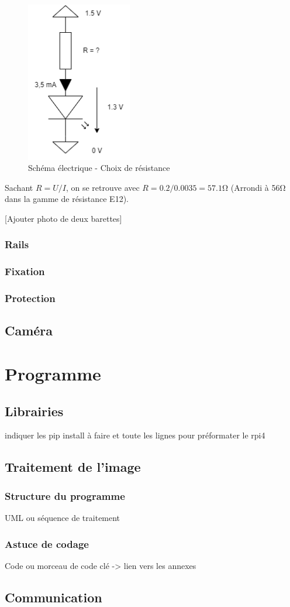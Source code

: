 \begin{figure}[H]
    \centering
    \includegraphics[height=7cm]{assets/figures/schema_led_res.png}
    \caption{Schéma électrique - Choix de résistance}
\end{figure}

Sachant \(R = U / I\), on se retrouve avec \(R = 0.2 / 0.0035 = 57.1 \si{\ohm} \) (Arrondi à 56\si{\ohm} dans la gamme de résistance E12).

    [Ajouter photo de deux barettes]

\subsubsection{Rails}
\subsubsection{Fixation}
\subsubsection{Protection}
\subsection{Caméra}

\section{Programme}
\subsection{Librairies}
indiquer les pip install à faire et toute les lignes pour préformater le rpi4
\subsection{Traitement de l'image}
\subsubsection{Structure du programme}
UML ou séquence de traitement
\subsubsection{Astuce de codage}
Code ou morceau de code clé -> lien vers les annexes
\subsection{Communication}
